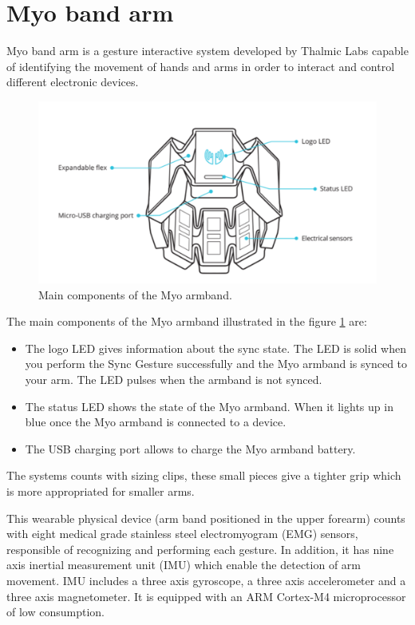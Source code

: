 \section{Myo band arm}

Myo band arm is a gesture interactive system developed by Thalmic Labs capable of identifying the movement of hands and arms in order to interact and control different electronic devices.

\begin{figure}[H]                    
	\includegraphics[width=.5\textwidth]{figures/myob/armband}  %
	\caption{Main components of the Myo armband. \cite{}}
	\label{fig:armband}  %
\end{figure}


The main components of the Myo armband illustrated in the figure \ref{fig:armband} are:
\begin{itemize}
\item The logo LED gives information about the sync state. The LED is solid when you perform the Sync Gesture successfully and
the Myo armband is synced to your arm. The LED pulses when the armband is not synced.
\item The status LED shows the state of the Myo armband. When it lights up in blue once the Myo armband is connected to a device. 
\item The USB charging port allows to charge the Myo armband battery. 
\end{itemize}
The systems counts with sizing clips, these small pieces give a tighter grip which is more appropriated for smaller arms.

This wearable physical device (arm band positioned in the upper forearm) counts with eight medical grade stainless steel electromyogram (EMG) sensors, responsible of recognizing and performing each gesture. In addition, it has nine axis inertial measurement unit (IMU) which enable the detection of arm movement. IMU includes a three axis gyroscope,  a three axis accelerometer and a three axis magnetometer. It is equipped with an ARM Cortex-M4 microprocessor of low consumption.

